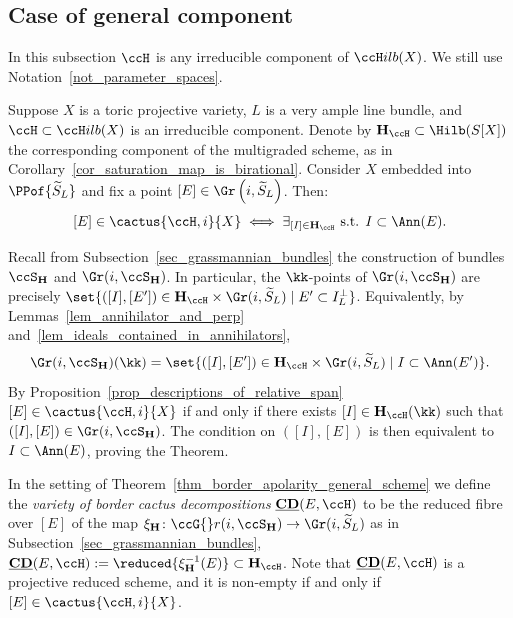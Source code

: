 \documentclass[12pt,a4paper]{article}
\newcommand{\usualHilb}{{\ccH}ilb}
\newcommand{\bCD}{\underline{\mathbf{CD}}}
\newcommand{\relGr}{\ccG{}r}
\begin{document}
\subsection{Case of general component}
In this subsection $\ccH$ is any irreducible component of $\usualHilb(X)$.
We still use Notation~\ref{not_parameter_spaces}.

\begin{thm}
   \label{thm_border_apolarity_general_scheme}
   Suppose $X$ is a toric projective variety, $L$ is a very ample line bundle, and $\ccH\subset \usualHilb(X)$ is an irreducible component.
   Denote by $\mathbf{H}_{\ccH}\subset \Hilb(S[X])$
   the corresponding  component of the multigraded scheme,
   as in Corollary~\ref{cor_saturation_map_is_birational}.
   Consider $X$ embedded into $\PPof{\widetilde{S}_L}$
   and fix a point $[E] \in \Gr\left(i, \widetilde{S}_L\right)$.
   Then:
   \[
     [E]\in \cactus{\ccH,i}{X} \iff
     \exists_{[I] \in \mathbf{H}_{\ccH}} \text{ s.t. } I \subset \Ann(E).
   \]
\end{thm}


\begin{prf}
   Recall from Subsection~\ref{sec_grassmannian_bundles} the construction of bundles $\ccS_{\mathbf{H}}$  and $\Gr(i, \ccS_{\mathbf{H}})$.
   In particular, the $\kk$-points of $\Gr(i, \ccS_{\mathbf{H}})$ are precisely
   $\set{([I], [E']) \in \mathbf{H}_{\ccH} \times \Gr(i,\widetilde{S}_L)  \mid  E' \subset I_L^{\perp}}$.
   Equivalently,
     by Lemmas~\ref{lem_annihilator_and_perp}
     and~\ref{lem_ideals_contained_in_annihilators},
   \[
     \Gr(i, \ccS_{\mathbf{H}})(\kk)=\set{([I], [E']) \in \mathbf{H}_{\ccH} \times \Gr(i,\widetilde{S}_L)  \mid  I \subset \Ann(E')}.
   \]
   By Proposition~\ref{prop_descriptions_of_relative_span}
   $[E]\in \cactus{\ccH,i}{X}$  if and only if
      there exists $[I]\in \mathbf{H}_{\ccH}(\kk)$ such that $([I],[E]) \in \Gr(i, \ccS_{\mathbf{H}})$.
   The condition on $([I],[E])$ is then equivalent to $I \subset \Ann(E)$, proving the Theorem.
\end{prf}

In the setting of Theorem~\ref{thm_border_apolarity_general_scheme}
we define the \emph{variety of border cactus decompositions}
$\bCD(E, \ccH)$ to be
the reduced fibre over $[E]$ of the map
$\xi_{\mathbf{H}} \colon \relGr(i,\ccS_{\mathbf{H}}) \to \Gr(i, \widetilde{S}_L)$
as in Subsection~\ref{sec_grassmannian_bundles},
$\bCD(E, \ccH):=\reduced{\xi_{\mathbf{H}}^{-1} (E)} \subset \mathbf{H}_{\ccH}$.
Note that $\bCD(E, \ccH)$ is a projective reduced scheme, and it is non-empty if and only if $[E]\in \cactus{\ccH,i}{X}$.
\end{document}
